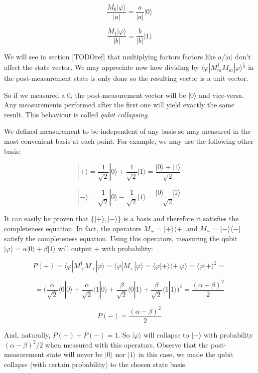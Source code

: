 $$ \frac{M_0|\varphi\rangle}{|a|} = \frac{a}{|a|}|0\rangle$$

$$ \frac{M_1|\varphi\rangle}{|b|} = \frac{b}{|b|}|1\rangle$$

We will see in section [TODOref] that multiplying factors factors like $a/|a|$ don't affect the state vector. We may appreciate now how dividing by $\langle\varphi|M_m^\dagger M_m|\varphi\rangle^{\frac{1}{2}}$ in the post-measurement state is only done so the resulting vector is a unit vector.

So if we measured a 0, the post-measurement vector will be $|0\rangle$ and vice-versa. Any measurements performed after the first one will yield exactly the same result. This behaviour is called \emph{qubit collapsing}.

We defined measurement to be independent of any basis so may measured in the most convenient basis at each point. For example, we may use the following other basis:

$$ |+\rangle = \frac{1}{\sqrt{2}}|0\rangle + \frac{1}{\sqrt{2}}|1\rangle = \frac{|0\rangle + |1\rangle}{\sqrt{2}} $$

$$ |-\rangle = \frac{1}{\sqrt{2}}|0\rangle - \frac{1}{\sqrt{2}}|1\rangle = \frac{|0\rangle - |1\rangle}{\sqrt{2}} $$

It can easily be proven that $\{|+\rangle, |-\rangle\}$ is a basis and therefore it satisfies the completeness equation. In fact, the operators $M_+ = |+\rangle\langle +|$ and $M_- = |-\rangle\langle -|$ satisfy the completeness equation. Using this operators, measuring the qubit $|\varphi\rangle = \alpha|0\rangle + \beta|1\rangle$ will output $+$ with probability:

$$ P(+) = \langle\varphi|M_+^\dagger M_+|\varphi\rangle = \langle\varphi|M_+|\varphi\rangle = \langle\varphi|+\rangle\langle+|\varphi\rangle = \langle\varphi|+\rangle^2 = $$

$$ = \bigg ( \frac{\alpha}{\sqrt{2}}\langle0|0\rangle + \frac{\alpha}{\sqrt{2}}\langle1|0\rangle + \frac{\beta}{\sqrt{2}}\langle0|1\rangle + \frac{\beta}{\sqrt{2}}\langle1|1\rangle \bigg )^2 = \frac{(\alpha + \beta)^2}{2} $$

$$ P(-) = \frac{(\alpha - \beta)^2}{2} $$

And, naturally, $P(+) + P(-) = 1$. So $|\varphi\rangle$ will collapse to $|+\rangle$ with probability $(\alpha - \beta)^2/2$ when measured with this operators. Observe that the post-measurement state will never be $|0\rangle$ nor $|1\rangle$ in this case, we made the qubit collapse (with certain probability) to the chosen state basis.

